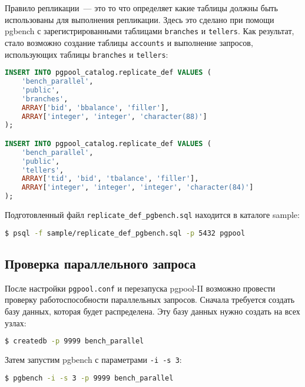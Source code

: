 Правило репликации~--- это то что определяет какие таблицы должны быть использованы для выполнения репликации. Здесь это сделано при помощи pgbench с зарегистрированными таблицами \lstinline!branches! и \lstinline!tellers!. Как результат, стало возможно создание таблицы \lstinline!accounts! и выполнение запросов, использующих таблицы \lstinline!branches! и \lstinline!tellers!:

\begin{lstlisting}[language=SQL,label=lst:pgpool35,caption=Установка правил репликации]
INSERT INTO pgpool_catalog.replicate_def VALUES (
    'bench_parallel',
    'public',
    'branches',
    ARRAY['bid', 'bbalance', 'filler'],
    ARRAY['integer', 'integer', 'character(88)']
);

INSERT INTO pgpool_catalog.replicate_def VALUES (
    'bench_parallel',
    'public',
    'tellers',
    ARRAY['tid', 'bid', 'tbalance', 'filler'],
    ARRAY['integer', 'integer', 'integer', 'character(84)']
);
\end{lstlisting}

Подготовленный файл \lstinline!replicate_def_pgbench.sql! находится в каталоге sample:

\begin{lstlisting}[language=Bash,label=lst:pgpool36,caption=Установка правил репликации]
$ psql -f sample/replicate_def_pgbench.sql -p 5432 pgpool
\end{lstlisting}


\subsection{Проверка параллельного запроса}

После настройки \lstinline!pgpool.conf! и перезапуска pgpool-II возможно провести проверку работоспособности параллельных запросов. Сначала требуется создать базу данных, которая будет распределена. Эту базу данных нужно создать на всех узлах:

\begin{lstlisting}[language=Bash,label=lst:pgpool37,caption=Проверка параллельного запроса]
$ createdb -p 9999 bench_parallel
\end{lstlisting}

Затем запустим pgbench с параметрами \lstinline!-i -s 3!:

\begin{lstlisting}[language=Bash,label=lst:pgpool38,caption=Проверка параллельного запроса]
$ pgbench -i -s 3 -p 9999 bench_parallel
\end{lstlisting}

